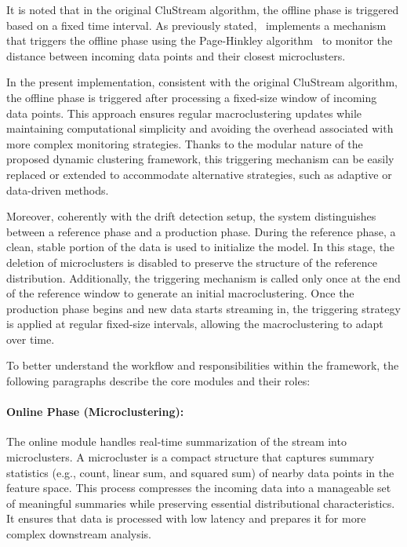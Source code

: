 It is noted that in the original CluStream algorithm, the offline phase is
triggered based on a fixed time interval. As previously
stated,~\cite{namitha_dynamic_clustering_2} implements a mechanism that
triggers the offline phase using the Page-Hinkley algorithm~\cite{page_hinkley}
to monitor the distance between incoming data points and their closest
microclusters.

In the present implementation, consistent with the original CluStream
algorithm, the offline phase is triggered after processing a fixed-size window
of incoming data points. This approach ensures regular macroclustering updates
while maintaining computational simplicity and avoiding the overhead associated
with more complex monitoring strategies. Thanks to the modular nature of the
proposed dynamic clustering framework, this triggering mechanism can be easily
replaced or extended to accommodate alternative strategies, such as adaptive or
data-driven methods.

Moreover, coherently with the drift detection setup, the system distinguishes
between a reference phase and a production phase. During the reference phase, a
clean, stable portion of the data is used to initialize the model. In this
stage, the deletion of microclusters is disabled to preserve the structure of
the reference distribution. Additionally, the triggering mechanism is called
only once at the end of the reference window to generate an initial
macroclustering. Once the production phase begins and new data starts streaming
in, the triggering strategy is applied at regular fixed-size intervals,
allowing the macroclustering to adapt over time.

To better understand the workflow and responsibilities within the framework,
the following paragraphs describe the core modules and their roles:

\paragraph{Online Phase (Microclustering):} The online module handles real-time summarization of the stream into
microclusters. A microcluster is a compact structure that captures summary
statistics (e.g., count, linear sum, and squared sum) of nearby data points in
the feature space. This process compresses the incoming data into a manageable
set of meaningful summaries while preserving essential distributional
characteristics. It ensures that data is processed with low latency and
prepares it for more complex downstream analysis.

